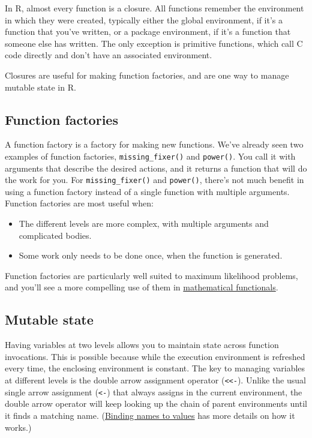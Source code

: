 In R, almost every function is a closure. All functions remember the
environment in which they were created, typically either the global
environment, if it's a function that you've written, or a package
environment, if it's a function that someone else has written. The only
exception is primitive functions, which call C code directly and don't
have an associated environment. 

Closures are useful for making function factories, and are one way to
manage mutable state in R.

\subsection{Function factories}

A function factory is a factory for making new functions. We've already
seen two examples of function factories, \texttt{missing\_fixer()} and
\texttt{power()}. You call it with arguments that describe the desired
actions, and it returns a function that will do the work for you. For
\texttt{missing\_fixer()} and \texttt{power()}, there's not much benefit
in using a function factory instead of a single function with multiple
arguments. Function factories are most useful when:

\begin{itemize}
\item
  The different levels are more complex, with multiple arguments and
  complicated bodies.
\item
  Some work only needs to be done once, when the function is generated.
\end{itemize}

Function factories are particularly well suited to maximum likelihood
problems, and you'll see a more compelling use of them in
\hyperref[functionals-math]{mathematical functionals}.

\subsection{Mutable state}\label{mutable-state}

Having variables at two levels allows you to maintain state across
function invocations. This is possible because while the execution
environment is refreshed every time, the enclosing environment is
constant. The key to managing variables at different levels is the
double arrow assignment operator (\texttt{\textless{}\textless{}-}).
Unlike the usual single arrow assignment (\texttt{\textless{}-}) that
always assigns in the current environment, the double arrow operator
will keep looking up the chain of parent environments until it finds a
matching name. (\hyperref[binding]{Binding names to values} has more
details on how it works.) \indexc{<<-} 

